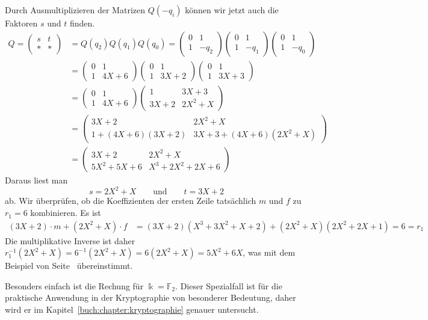 \begin{beispiel}
Durch Ausmultiplizieren der Matrizen $Q(-q_i)$ können wir jetzt auch die 
Faktoren $s$ und $t$ finden.
\begin{align*}
Q=\begin{pmatrix}
s&t\\
*&*
\end{pmatrix}
&= Q(q_2)Q(q_1)Q(q_0)
=
\begin{pmatrix}0&1\\1&-q_2\end{pmatrix}
\begin{pmatrix}0&1\\1&-q_1\end{pmatrix}
\begin{pmatrix}0&1\\1&-q_0\end{pmatrix}
\\
&=
\begin{pmatrix}
0&1\\
1&4X+6
\end{pmatrix}
\begin{pmatrix}
0&1\\
1&3X+2
\end{pmatrix}
\begin{pmatrix}
0&1\\
1&3X+3
\end{pmatrix}
\\
&=
\begin{pmatrix}
0&1\\
1&4X+6
\end{pmatrix}
\begin{pmatrix}
   1&3X+3\\
3X+2&2X^2 + X
\end{pmatrix}
\\
&=
\begin{pmatrix}
3X+2           &2X^2+X\\
1+(4X+6)(3X+2) &3X+3 + (4X+6)(2X^2+X)
\end{pmatrix}
\\
&=
\begin{pmatrix}
     3X+2 & 2X^2     +X\\
5X^2+5X+6 &  X^3+2X^2+2X+6
\end{pmatrix}
\end{align*}
Daraus liest man
\[
s
=
2X^2+X
\qquad\text{und}\qquad
t
=
3X+2
\]
ab.
Wir überprüfen, ob die Koeffizienten der ersten Zeile tatsächlich $m$ und $f$
zu $r_1=6$ kombinieren.
Es ist
\begin{align*}
(3X+2)\cdot m + (2X^2+X)\cdot f
&= 
(3X+2)
(X^3+3X^2+X+2)
+
(2X^2+X)
(2X^2+2X+1)
=
6=r_1
\end{align*}
Die multiplikative Inverse ist daher
$
r_1^{-1}(2X^2 + X)
=
6^{-1}
(2X^2 + X)
=
6
(2X^2 + X)
=
5X^2+6X$,
was mit dem Beispiel von
Seite~\pageref{buch:endlichekoerper:beispiel:inversemitmatrix}
übereinstimmt.
\end{beispiel}

Besonders einfach ist die Rechung für $\Bbbk=\mathbb{F}_2$.
Dieser Spezialfall ist für die praktische Anwendung in der Kryptographie
von besonderer Bedeutung, daher wird er im 
Kapitel~\ref{buch:chapter:kryptographie} genauer untersucht.

